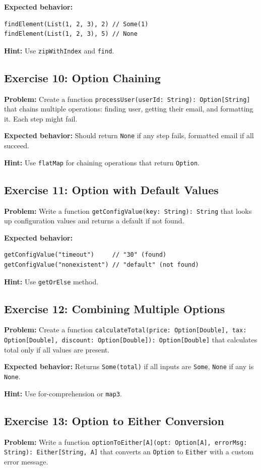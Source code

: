 \documentclass[12pt,a4paper]{article}
\begin{document}
\textbf{Expected behavior:}
\begin{lstlisting}
findElement(List(1, 2, 3), 2) // Some(1)
findElement(List(1, 2, 3), 5) // None
\end{lstlisting}

\textbf{Hint:} Use \texttt{zipWithIndex} and \texttt{find}.

\subsection{Exercise 10: Option Chaining}
\textbf{Problem:} Create a function \texttt{processUser(userId: String): Option[String]} that chains multiple operations: finding user, getting their email, and formatting it. Each step might fail.

\textbf{Expected behavior:} Should return \texttt{None} if any step fails, formatted email if all succeed.

\textbf{Hint:} Use \texttt{flatMap} for chaining operations that return \texttt{Option}.

\subsection{Exercise 11: Option with Default Values}
\textbf{Problem:} Write a function \texttt{getConfigValue(key: String): String} that looks up configuration values and returns a default if not found.

\textbf{Expected behavior:}
\begin{lstlisting}
getConfigValue("timeout")     // "30" (found)
getConfigValue("nonexistent") // "default" (not found)
\end{lstlisting}

\textbf{Hint:} Use \texttt{getOrElse} method.

\subsection{Exercise 12: Combining Multiple Options}
\textbf{Problem:} Create a function \texttt{calculateTotal(price: Option[Double], tax: Option[Double], discount: Option[Double]): Option[Double]} that calculates total only if all values are present.

\textbf{Expected behavior:} Returns \texttt{Some(total)} if all inputs are \texttt{Some}, \texttt{None} if any is \texttt{None}.

\textbf{Hint:} Use for-comprehension or \texttt{map3}.

\subsection{Exercise 13: Option to Either Conversion}
\textbf{Problem:} Write a function \texttt{optionToEither[A](opt: Option[A], errorMsg: String): Either[String, A]} that converts an \texttt{Option} to \texttt{Either} with a custom error message.
\end{document}
